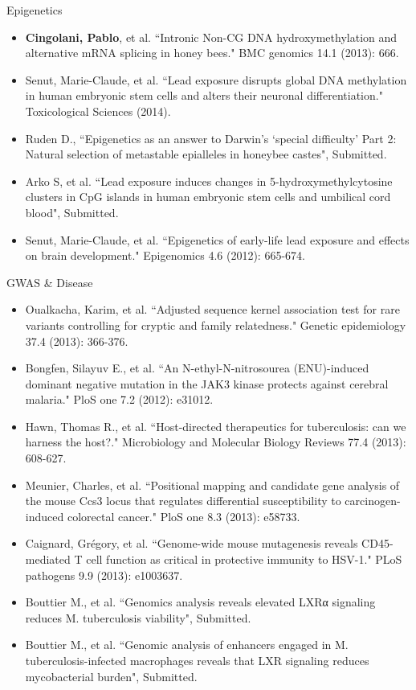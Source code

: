 \begin{description}

	\item Epigenetics 

	\begin{itemize}
		\item \textbf{Cingolani, Pablo}, et al. ``Intronic Non-CG DNA hydroxymethylation and alternative mRNA splicing in honey bees." BMC genomics 14.1 (2013): 666.
		\item Senut, Marie-Claude, et al. ``Lead exposure disrupts global DNA methylation in human embryonic stem cells and alters their neuronal differentiation." Toxicological Sciences (2014).
		\item Ruden D., ``Epigenetics as an answer to Darwin’s ‘special difficulty’ Part 2: Natural selection of metastable epialleles in honeybee castes", Submitted.
		\item Arko S, et al. ``Lead exposure induces changes in 5-hydroxymethylcytosine clusters in CpG islands in human embryonic stem cells and umbilical cord blood", Submitted.
		\item Senut, Marie-Claude, et al. ``Epigenetics of early-life lead exposure and effects on brain development." Epigenomics 4.6 (2012): 665-674.
	\end{itemize}	
	
	\item GWAS \& Disease 
	
	\begin{itemize}
		\item Oualkacha, Karim, et al. ``Adjusted sequence kernel association test for rare variants controlling for cryptic and family relatedness." Genetic epidemiology 37.4 (2013): 366-376.
		\item Bongfen, Silayuv E., et al. ``An N-ethyl-N-nitrosourea (ENU)-induced dominant negative mutation in the JAK3 kinase protects against cerebral malaria." PloS one 7.2 (2012): e31012.
		\item Hawn, Thomas R., et al. ``Host-directed therapeutics for tuberculosis: can we harness the host?." Microbiology and Molecular Biology Reviews 77.4 (2013): 608-627.
		\item Meunier, Charles, et al. ``Positional mapping and candidate gene analysis of the mouse Ccs3 locus that regulates differential susceptibility to carcinogen-induced colorectal cancer." PloS one 8.3 (2013): e58733.
		\item Caignard, Grégory, et al. ``Genome-wide mouse mutagenesis reveals CD45-mediated T cell function as critical in protective immunity to HSV-1." PLoS pathogens 9.9 (2013): e1003637.
		\item Bouttier M., et al. ``Genomics analysis reveals elevated LXRα signaling reduces M. tuberculosis viability", Submitted.
		\item Bouttier M., et al. ``Genomic analysis of enhancers engaged in M. tuberculosis-infected macrophages reveals that LXR signaling reduces mycobacterial burden", Submitted.
	\end{itemize}	
	

\end{description}
